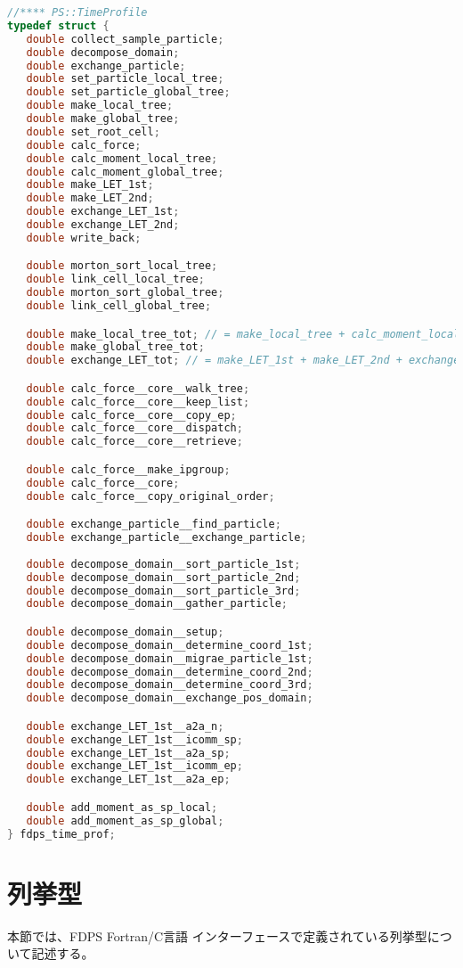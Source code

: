 \begin{lstlisting}[language=C,caption=時間プロファイル型 (C言語)]
//**** PS::TimeProfile
typedef struct {
   double collect_sample_particle;
   double decompose_domain;
   double exchange_particle;
   double set_particle_local_tree;
   double set_particle_global_tree;
   double make_local_tree;
   double make_global_tree;
   double set_root_cell;
   double calc_force;
   double calc_moment_local_tree;
   double calc_moment_global_tree;
   double make_LET_1st;
   double make_LET_2nd;
   double exchange_LET_1st;
   double exchange_LET_2nd;
   double write_back;

   double morton_sort_local_tree;
   double link_cell_local_tree;
   double morton_sort_global_tree;
   double link_cell_global_tree;

   double make_local_tree_tot; // = make_local_tree + calc_moment_local_tree
   double make_global_tree_tot;
   double exchange_LET_tot; // = make_LET_1st + make_LET_2nd + exchange_LET_1st + exchange_LET_2nd

   double calc_force__core__walk_tree;
   double calc_force__core__keep_list;
   double calc_force__core__copy_ep;
   double calc_force__core__dispatch;
   double calc_force__core__retrieve;

   double calc_force__make_ipgroup;
   double calc_force__core;
   double calc_force__copy_original_order;

   double exchange_particle__find_particle;
   double exchange_particle__exchange_particle;
   
   double decompose_domain__sort_particle_1st;
   double decompose_domain__sort_particle_2nd;
   double decompose_domain__sort_particle_3rd;
   double decompose_domain__gather_particle;

   double decompose_domain__setup;
   double decompose_domain__determine_coord_1st;
   double decompose_domain__migrae_particle_1st;
   double decompose_domain__determine_coord_2nd;
   double decompose_domain__determine_coord_3rd;
   double decompose_domain__exchange_pos_domain;

   double exchange_LET_1st__a2a_n;
   double exchange_LET_1st__icomm_sp;
   double exchange_LET_1st__a2a_sp;
   double exchange_LET_1st__icomm_ep;
   double exchange_LET_1st__a2a_ep;

   double add_moment_as_sp_local;
   double add_moment_as_sp_global;
} fdps_time_prof;
\end{lstlisting}

\section{列挙型}
\label{sec:enum_types}
本節では、FDPS Fortran/C言語 インターフェースで定義されている列挙型について記述する。

